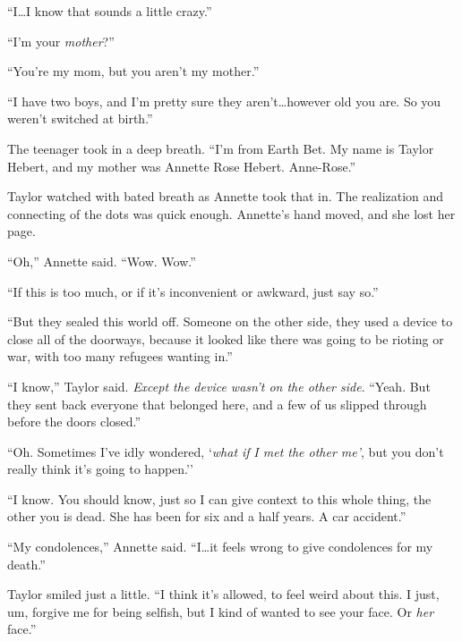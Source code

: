 ``I\ldots I know that sounds a little crazy.''



``I'm your \emph{mother}?''



``You're my mom, but you aren't my mother.''



``I have two boys, and I'm pretty sure they aren't\ldots however old you are.  So you weren't switched at birth.''



The teenager took in a deep breath.  ``I'm from Earth Bet.  My name is Taylor Hebert, and my mother was Annette Rose Hebert.  Anne-Rose.''



Taylor watched with bated breath as Annette took that in.  The realization and connecting of the dots was quick enough.  Annette's hand moved, and she lost her page.



``Oh,'' Annette said.  ``Wow.  Wow.''



``If this is too much, or if it's inconvenient or awkward, just say so.''



``But they sealed this world off.  Someone on the other side, they used a device to close all of the doorways, because it looked like there was going to be rioting or war, with too many refugees wanting in.''



``I know,'' Taylor said.  \emph{Except the device wasn't on the other side}.  ``Yeah.  But they sent back everyone that belonged here, and a few of us slipped through before the doors closed.''



``Oh.  Sometimes I've idly wondered, `\emph{what if }\emph{I met the other me'}, but you don't really think it's going to happen.''



``I know.  You should know, just so I can give context to this whole thing, the other you is dead.  She has been for six and a half years.  A car accident.''



``My condolences,''  Annette said.  ``I\ldots it feels wrong to give condolences for my death.''



Taylor smiled just a little.  ``I think it's allowed, to feel weird about this.  I just, um, forgive me for being selfish, but I kind of wanted to see your face.  Or \emph{her }face.''




